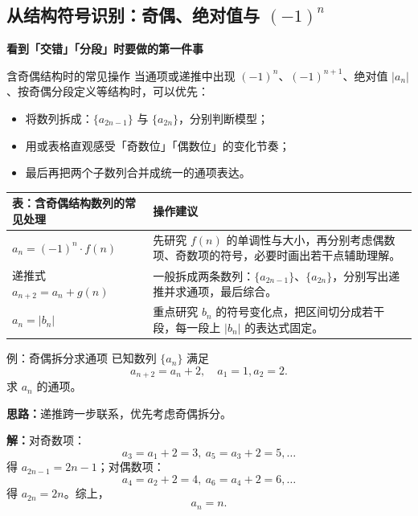 \documentclass[a4paper,11pt]{ctexart}
\newcommand{\SeqGuideMiniHeading}[1]{%
  \par\smallskip
  \noindent\textbf{#1}\par\smallskip
}
\begin{document}
\subsection{从结构符号识别：奇偶、绝对值与 $(-1)^n$}

\SeqGuideMiniHeading{看到「交错」「分段」时要做的第一件事}
\begin{notebox}{含奇偶结构时的常见操作}
  当通项或递推中出现 $(-1)^n$、$(-1)^{n+1}$、绝对值 $\lvert a_n\rvert$、按奇偶分段定义等结构时，可以优先：
  \begin{itemize}
    \item 将数列拆成：$\{a_{2n-1}\}$ 与 $\{a_{2n}\}$，分别判断模型；
    \item 用或表格直观感受「奇数位」「偶数位」的变化节奏；
    \item 最后再把两个子数列合并成统一的通项表达。
  \end{itemize}
\end{notebox}

\begin{center}
\begin{tabularx}{0.98\textwidth}{>{\raggedright\arraybackslash}p{3.2cm}X}
  \toprule
  \textbf{表：含奇偶结构数列的常见处理} & \textbf{操作建议} \\
  \midrule
  $a_n=(-1)^n\cdot f(n)$ &
    先研究 $f(n)$ 的单调性与大小，再分别考虑偶数项、奇数项的符号，必要时画出若干点辅助理解。 \\
  递推式 $a_{n+2}=a_n+g(n)$ &
    一般拆成两条数列：$\{a_{2n-1}\}$、$\{a_{2n}\}$，分别写出递推并求通项，最后综合。 \\
  $a_n=\lvert b_n\rvert$ &
    重点研究 $b_n$ 的符号变化点，把区间切分成若干段，每一段上 $\lvert b_n\rvert$ 的表达式固定。 \\
  \bottomrule
\end{tabularx}
\end{center}

\begin{examplebox}{例：奇偶拆分求通项}
  已知数列 $\{a_n\}$ 满足
  \[
    a_{n+2}=a_n+2,\quad a_1=1,a_2=2.
  \]
  求 $a_n$ 的通项。

  \textbf{思路：}递推跨一步联系，优先考虑奇偶拆分。

  \textbf{解：}对奇数项：
  \[
    a_3=a_1+2=3,\ a_5=a_3+2=5,\dots
  \]
  得 $a_{2n-1}=2n-1$；对偶数项：
  \[
    a_4=a_2+2=4,\ a_6=a_4+2=6,\dots
  \]
  得 $a_{2n}=2n$。综上，
  \[
    a_n=n.
  \]
\end{examplebox}

\clearpage
\end{document}
